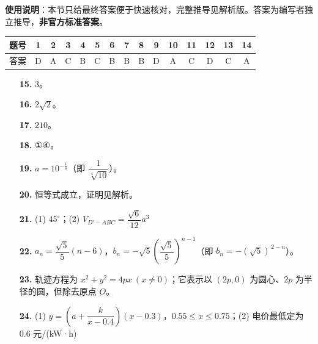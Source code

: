 
\begin{gknotice}
\textbf{使用说明}：本节只给最终答案便于快速核对，完整推导见解析版。答案为编写者独立推导，\textbf{非官方标准答案}。
\end{gknotice}

\begin{center}\begin{tabular}{ccccccccccccccc}
\toprule
题号 & 1 & 2 & 3 & 4 & 5 & 6 & 7 & 8 & 9 & 10 & 11 & 12 & 13 & 14 \\
\midrule
答案 & D & A & C & B & C & B & B & B & D & A & C & D & C & A \\
\bottomrule
\end{tabular}\end{center}

\begin{itemize}[leftmargin=2.6em]
  \item[\textbf{15.}] $3$。
  \item[\textbf{16.}] $2\sqrt2$。
  \item[\textbf{17.}] $210$。
  \item[\textbf{18.}] ①④。
\end{itemize}

\begin{itemize}[leftmargin=2.6em]
  \item[\textbf{19.}] $a=10^{-\frac14}$（即 $\dfrac{1}{\sqrt[4]{10}}$）。
  \item[\textbf{20.}] 恒等式成立，证明见解析。
  \item[\textbf{21.}] (1) $45^\circ$；(2) $V_{D'-ABC}=\dfrac{\sqrt6}{12}a^3$
  \item[\textbf{22.}] $a_n=\dfrac{\sqrt5}{5}(n-6)$，$b_n=-\sqrt5\left(\dfrac{\sqrt5}{5}\right)^{n-1}$（即 $b_n=-(\sqrt5)^{\,2-n}$）。
  \item[\textbf{23.}] 轨迹方程为 $x^2+y^2=4px\ (x\ne0)$；它表示以 $(2p,0)$ 为圆心、$2p$ 为半径的圆，但除去原点 $O$。
  \item[\textbf{24.}] (1) $y=\left(a+\dfrac{k}{x-0.4}\right)(x-0.3)$，$0.55\le x\le0.75$；(2) 电价最低定为 $0.6$ 元/(kW·h)
\end{itemize}
